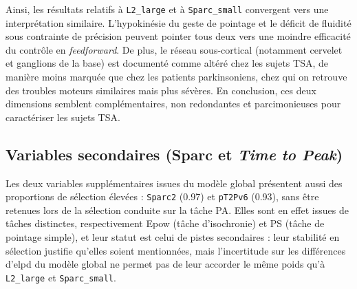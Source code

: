Ainsi, les résultats relatifs à \texttt{L2\_large} et à \texttt{Sparc\_small} convergent vers une interprétation similaire. L'hypokinésie du geste de pointage et le déficit de fluidité sous contrainte de précision peuvent pointer tous deux vers une moindre efficacité du contrôle en \textit{feedforward}. De plus, le réseau sous-cortical (notamment cervelet et ganglions de la base) est documenté comme altéré chez les sujets TSA, de manière moins marquée que chez les patients parkinsoniens, chez qui on retrouve des troubles moteurs similaires mais plus sévères. En conclusion, ces deux dimensions semblent complémentaires, non redondantes et parcimonieuses pour caractériser les sujets TSA.
%
%
%
%


\subsection{Variables secondaires (Sparc et \textit{Time to Peak})}

Les deux variables supplémentaires issues du modèle global présentent aussi des proportions de sélection élevées : \texttt{Sparc2} (0.97) et \texttt{pT2Pv6} (0.93), sans être retenues lors de la sélection conduite sur la tâche PA. Elles sont en effet issues de tâches distinctes, respectivement Epow (tâche d'isochronie) et PS (tâche de pointage simple), et leur statut est celui de pistes secondaires : leur stabilité en sélection justifie qu'elles soient mentionnées, mais l'incertitude sur les différences d'elpd du modèle global ne permet pas de leur accorder le même poids qu'à \texttt{L2\_large} et \texttt{Sparc\_small}. %

